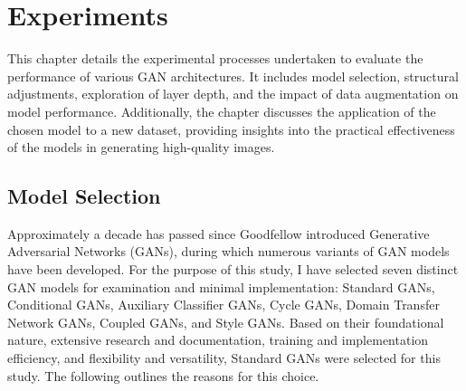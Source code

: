 \chapter{Experiments}
\label{Experiments}

This chapter details the experimental processes undertaken to evaluate the performance of various GAN 
architectures. It includes model selection, structural adjustments, exploration of layer depth, and the 
impact of data augmentation on model performance. Additionally, the chapter discusses the application of 
the chosen model to a new dataset, providing insights into the practical effectiveness of the models 
in generating high-quality images. 


\section{Model Selection}
Approximately a decade has passed since Goodfellow introduced Generative Adversarial Networks (GANs), 
during which numerous variants of GAN models have been developed. For the purpose of this study, 
I have selected seven distinct GAN models for examination and minimal implementation: Standard GANs, 
Conditional GANs, Auxiliary Classifier GANs, Cycle GANs, Domain Transfer Network GANs, Coupled GANs, 
and Style GANs. Based on their foundational nature, extensive research and documentation, training and 
implementation efficiency, and flexibility and versatility, Standard GANs were selected for this study. 
The following outlines the reasons for this choice.



